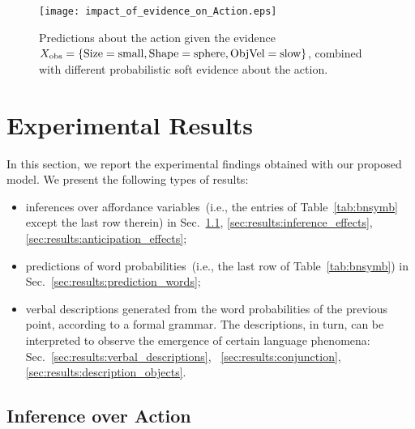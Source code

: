 
\begin{figure}
\centering
\texttt{[image: impact\_of\_evidence\_on\_Action.eps]}
\caption{Predictions about the action given the evidence $X_\text{obs} =\{\text{Size}=\text{small}, \text{Shape}=\text{sphere}, \text{ObjVel}=\text{slow}\}$, combined with different probabilistic soft evidence about the action.}
\label{fig:impact_of_evidence_on_Action}
\end{figure}

\section{Experimental Results}
\label{sec:results}

In this section, we report the experimental findings obtained with our proposed model.
We present the following types of results:
\begin{itemize}
  \item inferences over affordance variables~(i.e., the entries of Table~\ref{tab:bnsymb} except the last row therein) in Sec.~\ref{sec:results:inference_actions}, \ref{sec:results:inference_effects}, \ref{sec:results:anticipation_effects};

  \item predictions of word probabilities~(i.e., the last row of Table~\ref{tab:bnsymb}) in Sec.~\ref{sec:results:prediction_words};

  \item verbal descriptions generated from the word probabilities of the previous point, according to a formal grammar. The descriptions, in turn, can be interpreted to observe the emergence of certain language phenomena: Sec.~\ref{sec:results:verbal_descriptions}, ~\ref{sec:results:conjunction}, \ref{sec:results:description_objects}.
\end{itemize}

\subsection{Inference over Action}
\label{sec:results:inference_actions}

